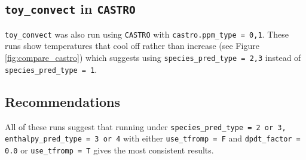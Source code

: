 \subsection{{\tt toy\_convect} in {\tt CASTRO}}

{\tt toy\_convect} was also run using {\tt CASTRO} with 
{\tt castro.ppm\_type = 0,1}. These runs show temperatures that cool 
off rather than increase (see Figure \ref{fig:compare_castro}) which 
suggests using {\tt species\_pred\_type = 2,3} instead of 
{\tt species\_pred\_type = 1}. 



\subsection{Recommendations}

All of these runs suggest that running under {\tt species\_pred\_type = 
2 or 3, enthalpy\_pred\_type = 3 or 4} with either {{\tt use\_tfromp = F} and 
{\tt dpdt\_factor = 0.0}} or {\tt use\_tfromp = T} gives the most 
consistent results.



